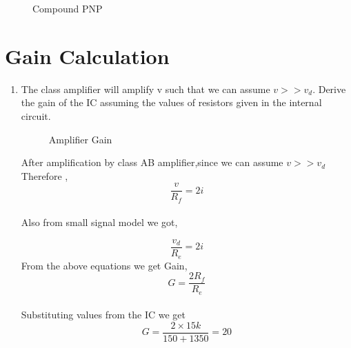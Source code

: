 \documentclass[journal,12pt,twocolumn]{IEEEtran}
\renewcommand\thesection{\arabic{section}}
\begin{document}
\begin{enumerate}[label=\thesection.\arabic*,ref=\thesection.\theenumi]
\begin{figure}[!ht]
\centering	
\resizebox{\columnwidth}{!}{}
\caption{Compound PNP}
\label{fig:compound}	
\end{figure}
%
% 
%
\end{enumerate}

\section{Gain Calculation}
\begin{enumerate}[label=\thesection.\arabic*,ref=\thesection.\theenumi]
\item The class amplifier will amplify v such that we can assume $v>>v_{d}$. Derive the gain of the IC assuming the values of resistors given in the internal circuit.\\
\solution
\begin{figure}[!ht]
\centering	
\resizebox{\columnwidth}{!}{}
\caption{Amplifier Gain}
\label{fig:ampgain}	
\end{figure}
% 
%

After amplification by class AB amplifier,since we can assume $v>>v_{d}$ \\
Therefore , $$\frac{v}{R_{f}}=2i$$ \\
Also from small signal model we got,

   $$ \frac{v_{d}}{R_{e}}=2i
$$
From the above equations we get Gain, $$G=\frac{2 R_{f}}{R_{e}}$$\\
Substituting values from the IC we get $$G=\frac{2 \times 15k}{150+1350} =20$$    

\end{enumerate}
\end{document}
